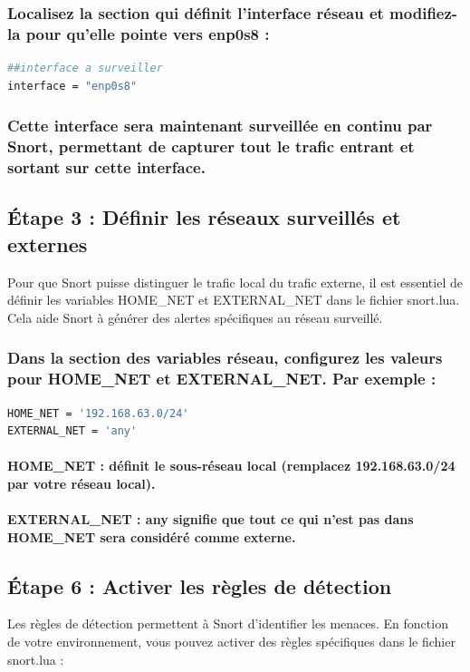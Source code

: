 \documentclass[12pt]{article}
\begin{document}
\subsubsection{Localisez la section qui définit l’interface réseau et modifiez-la pour qu’elle pointe vers enp0s8 :}

\begin{lstlisting}[language=bash]
##interface a surveiller
interface = "enp0s8"
\end{lstlisting}
\subsubsection{Cette interface sera maintenant surveillée en continu par Snort, permettant de capturer tout le trafic entrant et sortant sur cette interface.}

\subsection{Étape 3 : Définir les réseaux surveillés et externes}
Pour que Snort puisse distinguer le trafic local du trafic externe, il est essentiel de définir les variables HOME\_NET et EXTERNAL\_NET dans le fichier snort.lua. Cela aide Snort à générer des alertes spécifiques au réseau surveillé.
\subsubsection{Dans la section des variables réseau, configurez les valeurs pour HOME\_NET et EXTERNAL\_NET. Par exemple :}

\begin{lstlisting}[language=bash]
HOME_NET = '192.168.63.0/24'
EXTERNAL_NET = 'any'
\end{lstlisting}
\paragraph{HOME\_NET : définit le sous-réseau local (remplacez 192.168.63.0/24 par votre réseau local).
}
\paragraph{EXTERNAL\_NET : any signifie que tout ce qui n’est pas dans HOME\_NET sera considéré comme externe.
}
\subsection{Étape 6 : Activer les règles de détection}
Les règles de détection permettent à Snort d’identifier les menaces. En fonction de votre environnement, vous pouvez activer des règles spécifiques dans le fichier snort.lua :
\end{document}
